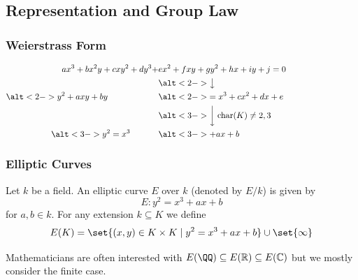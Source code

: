 \documentclass{beamer}
\newcommand{\disponslide}[2]{%
  \alt<#1>{#2}{\phantom{#2}}}
\begin{document}
\subsection{Representation and Group Law}
\begin{frame}
    \frametitle{Weierstrass Form} 
    \begin{align*}
        a x^3 + b x^2 y + c x y^2 + d y^3 +& e x^2 + f x y + g y^2 + h x + i y + j = 0 \\
        &\disponslide{2-}{\big\downarrow} \\
        \disponslide{2-}{y^2 + a xy + b y} & \disponslide{2-}{= x^3 + c x^2 + d x + e} \\
        &\disponslide{3-}{\bigg\downarrow \; \mathrm{char}(K) \neq 2, 3} \\
        \disponslide{3-}{y^2 = x^3 }&\disponslide{3-}{+ a x + b}
    \end{align*}
\end{frame}

\begin{frame}
    \frametitle{Elliptic Curves}
    \begin{definition}
        Let $k$ be a field. An elliptic curve $E$ over $k$ (denoted by $E/k$) is given by 
        \[ E: y^2 = x^3 + a x + b \]
        for $a, b \in k$. 
        \pause
        For any extension $k\subseteq K$ we define
        \[ E(K) = \set{(x, y) \in K \times K \mid y^2 = x^3 + a x + b } \cup \set{ \infty } \]
    \end{definition}
    \pause
    Mathematicians are often interested with $E(\QQ) \subseteq E(\mathbb{R}) \subseteq E(\mathbb{C})$ but we mostly consider the finite case.
\end{frame}
\end{document}
